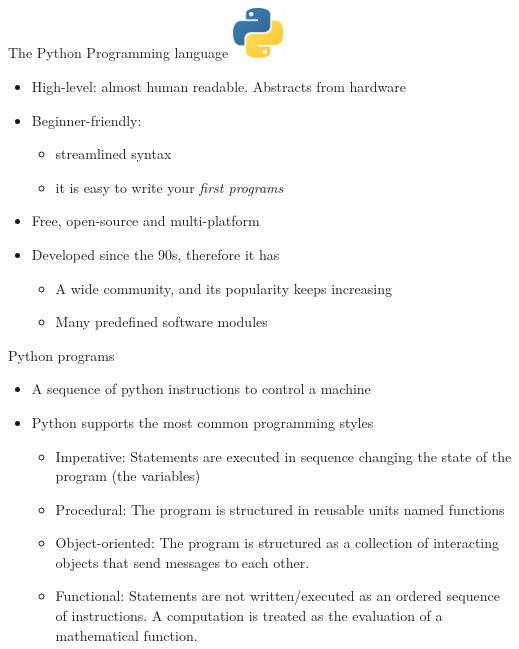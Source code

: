 \documentclass{beamer}%
\begin{document}
\begin{frame}{The Python Programming language}
	\centering
	\includegraphics[width=0.1\textwidth]{figures/python-logo}
	
	\begin{itemize}
		\item High-level: almost human readable. Abstracts from hardware
		\item Beginner-friendly: 
		\begin{itemize}
			\item streamlined syntax
			\item it is easy to write your \emph{first programs}
		\end{itemize}	
		\item Free, open-source and multi-platform
		\item Developed since the 90s, therefore it has 
		\begin{itemize}
			\item A wide community, and its popularity keeps increasing
			\item Many predefined software modules
		\end{itemize}
	\end{itemize}
\end{frame}

\begin{frame}{Python programs}
	\begin{itemize}
		\item A sequence of python instructions to control a machine
		\item Python supports the most common programming styles
		\begin{itemize}
			\item Imperative: Statements are executed in sequence changing the state of the program (the variables)
			\item Procedural: The program is structured in reusable units named functions
			\item Object-oriented: The program is structured as a collection of interacting objects that send messages to each other.
			\item {\color{gray}Functional: Statements are not written/executed as an ordered sequence of instructions. A computation is treated as the evaluation of a mathematical function.}
		\end{itemize}
	\end{itemize}
\end{frame}
\end{document}
